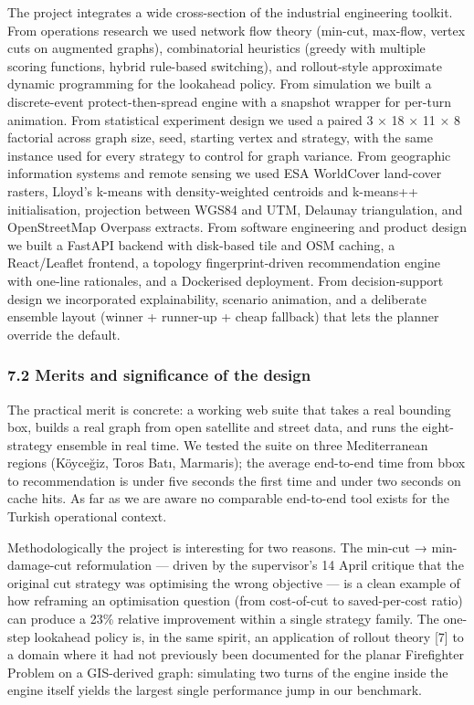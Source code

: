 \documentclass[
  11pt,
]{article}
\begin{document}
The project integrates a wide cross-section of the industrial
engineering toolkit. From operations research we used network flow
theory (min-cut, max-flow, vertex cuts on augmented graphs),
combinatorial heuristics (greedy with multiple scoring functions, hybrid
rule-based switching), and rollout-style approximate dynamic programming
for the lookahead policy. From simulation we built a discrete-event
protect-then-spread engine with a snapshot wrapper for per-turn
animation. From statistical experiment design we used a paired 3 × 18 ×
11 × 8 factorial across graph size, seed, starting vertex and strategy,
with the same instance used for every strategy to control for graph
variance. From geographic information systems and remote sensing we used
ESA WorldCover land-cover rasters, Lloyd's k-means with density-weighted
centroids and k-means++ initialisation, projection between WGS84 and
UTM, Delaunay triangulation, and OpenStreetMap Overpass extracts. From
software engineering and product design we built a FastAPI backend with
disk-based tile and OSM caching, a React/Leaflet frontend, a topology
fingerprint-driven recommendation engine with one-line rationales, and a
Dockerised deployment. From decision-support design we incorporated
explainability, scenario animation, and a deliberate ensemble layout
(winner + runner-up + cheap fallback) that lets the planner override the
default.

\subsubsection{7.2 Merits and significance of the
design}\label{merits-and-significance-of-the-design}

The practical merit is concrete: a working web suite that takes a real
bounding box, builds a real graph from open satellite and street data,
and runs the eight-strategy ensemble in real time. We tested the suite
on three Mediterranean regions (Köyceğiz, Toros Batı, Marmaris); the
average end-to-end time from bbox to recommendation is under five
seconds the first time and under two seconds on cache hits. As far as we
are aware no comparable end-to-end tool exists for the Turkish
operational context.

Methodologically the project is interesting for two reasons. The min-cut
→ min-damage-cut reformulation --- driven by the supervisor's 14 April
critique that the original cut strategy was optimising the wrong
objective --- is a clean example of how reframing an optimisation
question (from cost-of-cut to saved-per-cost ratio) can produce a 23\%
relative improvement within a single strategy family. The one-step
lookahead policy is, in the same spirit, an application of rollout
theory {[}7{]} to a domain where it had not previously been documented
for the planar Firefighter Problem on a GIS-derived graph: simulating
two turns of the engine inside the engine itself yields the largest
single performance jump in our benchmark.
\end{document}
